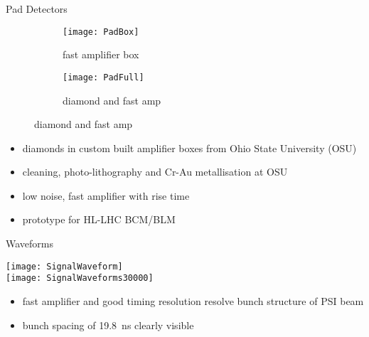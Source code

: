 \begin{frame}{Pad Detectors}

	\begin{figure}[h] 
		\centering
		\begin{subfigure}{0.45\textwidth}  
			\centering
			\texttt{[image: PadBox]}
			\caption{fast amplifier box}
		\end{subfigure}
		\begin{subfigure}{0.45\textwidth} 
			\centering
			\texttt{[image: PadFull]}
			\caption{diamond and fast amp} 	
		\end{subfigure} 
	\end{figure}
	\vspace*{-10pt}
	
	\begin{itemize}
		\itemfill
		\item diamonds in custom built amplifier boxes from Ohio State University (OSU)
		\item cleaning, photo-lithography and Cr-Au metallisation at OSU
		\item low noise, fast amplifier with  rise time
		\item prototype for HL-LHC BCM/BLM
	\end{itemize}
	
\end{frame}
\begin{frame}{Waveforms}
	\vspace*{-20pt}
	\begin{center}
		\texttt{[image: SignalWaveform]}\\
		\texttt{[image: SignalWaveforms30000]}
	\end{center}
	\begin{itemize}
		\item fast amplifier and good timing resolution \ra resolve bunch structure of PSI beam
		\item bunch spacing of \SI{19.8}{ns} clearly visible
	\end{itemize}
\end{frame}
